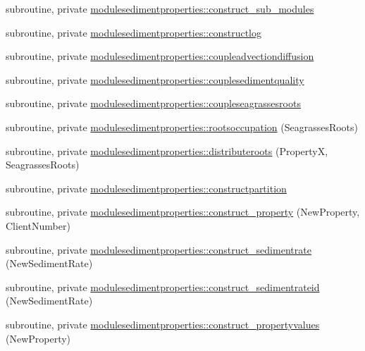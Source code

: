 \begin{DoxyCompactItemize}
\item 
subroutine, private \mbox{\hyperlink{namespacemodulesedimentproperties_a908a832201f28cb160dc5c859ab8af03}{modulesedimentproperties\+::construct\+\_\+sub\+\_\+modules}}
\item 
subroutine, private \mbox{\hyperlink{namespacemodulesedimentproperties_a8adc335e0f9814d9866b9c91620279fb}{modulesedimentproperties\+::constructlog}}
\item 
subroutine, private \mbox{\hyperlink{namespacemodulesedimentproperties_a7337c30e5645edde83be4dae7d323f3b}{modulesedimentproperties\+::coupleadvectiondiffusion}}
\item 
subroutine, private \mbox{\hyperlink{namespacemodulesedimentproperties_ab1ad9fb8e7d7a22675312273d0b5abc5}{modulesedimentproperties\+::couplesedimentquality}}
\item 
subroutine, private \mbox{\hyperlink{namespacemodulesedimentproperties_ab7687e8a644768320a332dacba7eb257}{modulesedimentproperties\+::coupleseagrassesroots}}
\item 
subroutine, private \mbox{\hyperlink{namespacemodulesedimentproperties_ac9dd7bcf2f966e31f868dc3dc7a2cc13}{modulesedimentproperties\+::rootsoccupation}} (Seagrasses\+Roots)
\item 
subroutine, private \mbox{\hyperlink{namespacemodulesedimentproperties_ab83ce67b0749c96200f2b82879c0b349}{modulesedimentproperties\+::distributeroots}} (PropertyX, Seagrasses\+Roots)
\item 
subroutine, private \mbox{\hyperlink{namespacemodulesedimentproperties_a25b9b3491582d3d95d7501a1a79de02d}{modulesedimentproperties\+::constructpartition}}
\item 
subroutine, private \mbox{\hyperlink{namespacemodulesedimentproperties_ab01eb007762b8ce8366245977a153ea9}{modulesedimentproperties\+::construct\+\_\+property}} (New\+Property, Client\+Number)
\item 
subroutine, private \mbox{\hyperlink{namespacemodulesedimentproperties_a945018b7c1fcfbb5687c6021d5636530}{modulesedimentproperties\+::construct\+\_\+sedimentrate}} (New\+Sediment\+Rate)
\item 
subroutine, private \mbox{\hyperlink{namespacemodulesedimentproperties_af77439b27c476526490c3dafac1f3411}{modulesedimentproperties\+::construct\+\_\+sedimentrateid}} (New\+Sediment\+Rate)
\item 
subroutine, private \mbox{\hyperlink{namespacemodulesedimentproperties_a63773e38287296de2a4e2baec3bfe034}{modulesedimentproperties\+::construct\+\_\+propertyvalues}} (New\+Property)

\end{DoxyCompactItemize}
